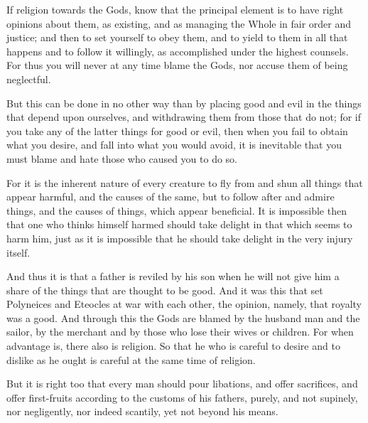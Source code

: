 If religion towards the Gods, know that  the principal element is to have right
opinions about them, as  existing, and as managing the Whole  in fair order and
justice; and  then to set yourself  to obey them, and  to yield to them  in all
that happens  and to  follow it  willingly, as  accomplished under  the highest
counsels. For thus you  will never at any time blame the  Gods, nor accuse them
of being neglectful.

But this  can be  done in no  other way than  by placing  good and evil  in the
things that depend upon ourselves, and withdrawing them from those that do not;
for if you take  any of the latter things for good or  evil, then when you fail
to obtain what you desire, and fall into what you would avoid, it is inevitable
that you must blame and hate those who caused you to do so.

For it is the inherent nature of every creature to fly from and shun all things
that appear harmful, and the causes of the same, but to follow after and admire
things, and  the causes of  things, which  appear beneficial. It  is impossible
then that one who thinks himself harmed should take delight in that which seems
to harm him, just  as it is impossible that he should take  delight in the very
injury itself.

And thus it is that a father is reviled  by his son when he will not give him a
share of  the things  that are thought  to be  good. And it  was this  that set
Polyneices  and Eteocles  at war  with each  other, the  opinion, namely,  that
royalty was a good. And through this the Gods are blamed by the husband man and
the sailor, by the merchant and by  those who lose their wives or children. For
when advantage is, there also is religion.  So that he who is careful to desire
and to dislike as he ought is careful at the same time of religion.

But it is right too that every man should pour libations, and offer sacrifices,
and offer first-fruits according to the customs of his fathers, purely, and not
supinely, nor negligently, nor indeed scantily, yet not beyond his means.
